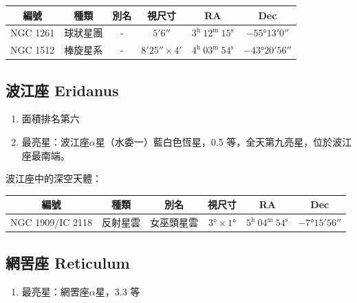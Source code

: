\begin{center}
\begin{longtable}{c | c | c | c | c | c}
    編號 & 種類 & 別名 & 視尺寸 & RA & Dec \\
    \hline
    \endfirsthead


    \endfoot

    \endlastfoot

    NGC 1261 & 球狀星團 & - & \(\ang{;5;6}\) & \(3^\text{h }12^\text{m }15^\text{s}\) & \(-\ang{55;13;0}\) \\
    NGC 1512 & 棒旋星系 & - & \(\ang{;8;25}\times\ang{;4;}\) & \(4^\text{h }03^\text{m }54^\text{s}\) & \(-\ang{43;20;56}\) 
\end{longtable}
\end{center}

\subsection{波江座 Eridanus}
\begin{enumerate}
    \item 面積排名第六
    \item 最亮星：波江座\(\alpha\)星（水委一）藍白色恆星，0.5 等，全天第九亮星，位於波江座最南端。
\end{enumerate}
波江座中的深空天體：

\begin{center}
\begin{longtable}{c | c | c | c | c | c}
    編號 & 種類 & 別名 & 視尺寸 & RA & Dec \\
    \hline
    \endfirsthead


    \endfoot

    \endlastfoot

    NGC 1909/IC 2118 & 反射星雲 & 女巫頭星雲 & \(\ang{3;;}\times\ang{1;;}\) & \(5^\text{h }04^\text{m }54^\text{s}\) & \(-\ang{7;15;56}\) \\
\end{longtable}
\end{center}

\subsection{網罟座 Reticulum}
\begin{enumerate}
    \item 最亮星：網罟座\(\alpha\)星，3.3 等
\end{enumerate}